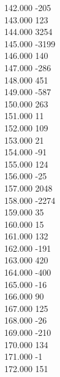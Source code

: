 { 142.000	-205 \\
 143.000	123 \\
 144.000	3254 \\
 145.000	-3199 \\
 146.000	140 \\
 147.000	-286 \\
 148.000	451 \\
 149.000	-587 \\
 150.000	263 \\
 151.000	11 \\
 152.000	109 \\
 153.000	21 \\
 154.000	-91 \\
 155.000	124 \\
 156.000	-25 \\
 157.000	2048 \\
 158.000	-2274 \\
 159.000	35 \\
 160.000	15 \\
 161.000	132 \\
 162.000	-191 \\
 163.000	420 \\
 164.000	-400 \\
 165.000	-16 \\
 166.000	90 \\
 167.000	125 \\
 168.000	-26 \\
 169.000	-210 \\
 170.000	134 \\
 171.000	-1 \\
 172.000	151 \\
}
